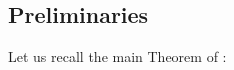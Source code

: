 \documentclass{amsart}
\numberwithin{equation}{section}
\newcommand{\End}{\mathrm{End}}
\begin{document}












\subsection{Preliminaries}


Let us recall the main Theorem of \cite{MR2357747}:
\end{document}
